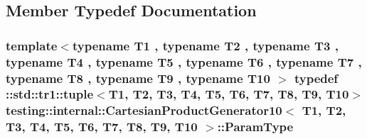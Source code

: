 \subsection{Member Typedef Documentation}
\hypertarget{classtesting_1_1internal_1_1_cartesian_product_generator10_aa483a5910f5dbfb974b43f93853f4b29}{
\subsubsection[{Param\-Type}]{\setlength{\rightskip}{0pt plus 5cm}template$<$typename T1 , typename T2 , typename T3 , typename T4 , typename T5 , typename T6 , typename T7 , typename T8 , typename T9 , typename T10 $>$ typedef \-::{\bf std\-::tr1\-::tuple}$<$T1, T2, T3, T4, T5, T6, T7, T8, T9, T10$>$ {\bf testing\-::internal\-::\-Cartesian\-Product\-Generator10}$<$ T1, T2, T3, T4, T5, T6, T7, T8, T9, T10 $>$\-::{\bf Param\-Type}}}\label{classtesting_1_1internal_1_1_cartesian_product_generator10_aa483a5910f5dbfb974b43f93853f4b29}


